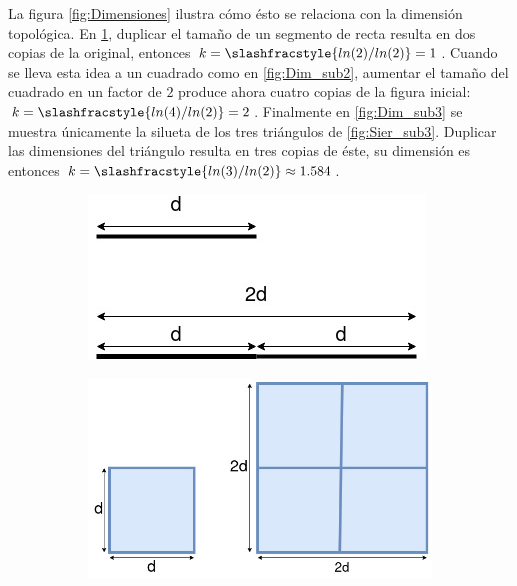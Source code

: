 \documentclass[letterpaper,12pt,oneside]{book}
\begin{document}
La figura \ref{fig:Dimensiones} ilustra cómo ésto se relaciona con la dimensión topológica. En \ref{fig:Dim_sub1}, duplicar el tamaño de un segmento de recta resulta en dos copias de la original, entonces $k = \slashfracstyle{ln(2) / ln(2)} = 1$. Cuando se lleva esta idea a un cuadrado como en  \ref{fig:Dim_sub2}, aumentar el tamaño del cuadrado en un factor de $2$ produce ahora cuatro copias de la figura inicial: $k = \slashfracstyle{ln(4) / ln(2)} = 2$. Finalmente en \ref{fig:Dim_sub3} se muestra únicamente la silueta de los tres triángulos de \ref{fig:Sier_sub3}. Duplicar las dimensiones del triángulo resulta en tres copias de éste, su dimensión es entonces $k = \slashfracstyle{ln(3) / ln(2)} \approx 1.584$. 


\begin{figure}[h]
\centering
\begin{subfigure}{.30\textwidth}
  \vspace{2cm}
  \centering
  \includegraphics[width=1\linewidth]{Ilustraciones/Cap_SFI/Escalas_Linea.jpg}
  \caption{}
  \label{fig:Dim_sub1}
\end{subfigure}%
\begin{subfigure}{.30\textwidth}
  \centering
  \includegraphics[width=1\linewidth]{Ilustraciones/Cap_SFI/Escala_cuadrado.jpg}

\end{subfigure}
\end{figure}
\end{document}
